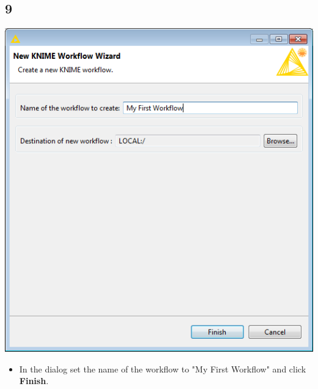 \documentclass{beamer}
\begin{document}
\subsection{9}
\begin{frame}
	\begin{center}
  		\includegraphics[height=0.6\textheight]{9.png}
	\end{center}
	\begin{itemize}
		\item In the dialog set the name of the workflow to "My First Workflow" and click \textbf{Finish}.		
	\end{itemize}
\end{frame}
\end{document}
